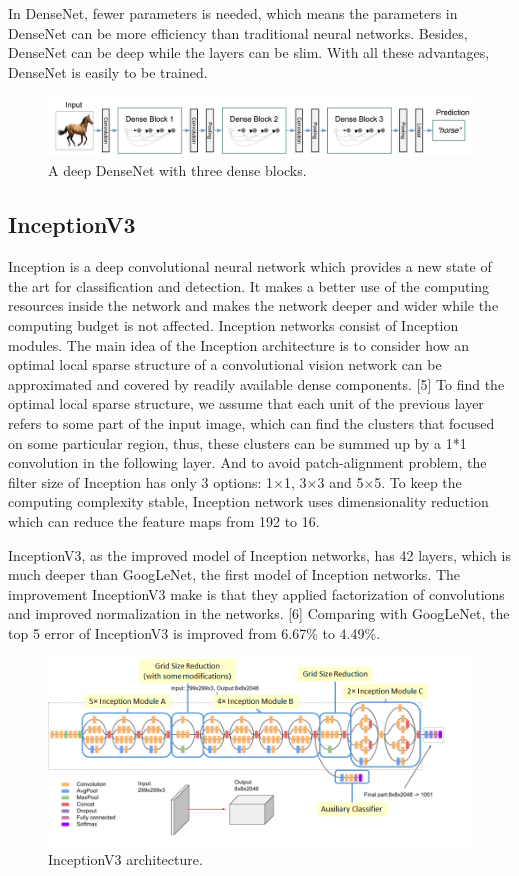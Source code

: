 \documentclass{article}
\begin{document}
In DenseNet, fewer parameters is needed, which means the parameters in DenseNet can be more efficiency than traditional neural networks. Besides, DenseNet can be deep while the layers can be slim. With all these advantages, DenseNet is easily to be trained.

\begin{figure}[h]
	\centering
	\includegraphics[width=0.8\linewidth]{pics/adensenet} 
	\caption{A deep DenseNet with three dense blocks.}
\end{figure}

\subsection{InceptionV3}

Inception is a deep convolutional neural network which provides a new state of the art for classification and detection. It makes a better use of the computing resources inside the network and makes the network deeper and wider while the computing budget is not affected. Inception networks consist of Inception modules. The main idea of the Inception architecture is to consider how an optimal local sparse structure of a convolutional vision network can be approximated and covered by readily available dense components. [5] To find the optimal local sparse structure, we assume that each unit of the previous layer refers to some part of the input image, which can find the clusters that focused on some particular region, thus, these clusters can be summed up by a 1*1 convolution in the following layer. And to avoid patch-alignment problem, the filter size of Inception has only 3 options: 1$\times$1, 3$\times$3 and 5$\times$5. To keep the computing complexity stable, Inception network uses dimensionality reduction which can reduce the feature maps from 192 to 16.

InceptionV3, as the improved model of Inception networks, has 42 layers, which is much deeper than GoogLeNet, the first model of Inception networks. The improvement InceptionV3 make is that they applied factorization of convolutions and improved normalization in the networks. [6] Comparing with GoogLeNet, the top 5 error of InceptionV3 is improved from 6.67\% to 4.49\%.

\begin{figure}[H]
	\centering
	\includegraphics[width=0.8\linewidth]{pics/inception} 
	\caption{InceptionV3 architecture.}
\end{figure}
\end{document}
